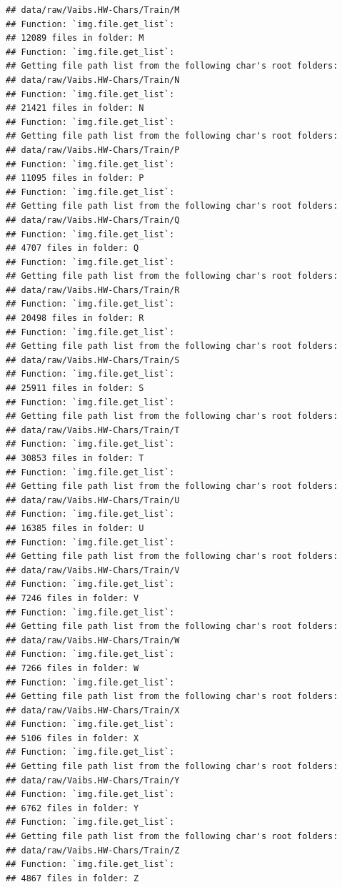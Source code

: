 \documentclass[
]{report}
\begin{document}
\begin{verbatim}
## data/raw/Vaibs.HW-Chars/Train/M
## Function: `img.file.get_list`:
## 12089 files in folder: M
## Function: `img.file.get_list`:
## Getting file path list from the following char's root folders:
## data/raw/Vaibs.HW-Chars/Train/N
## Function: `img.file.get_list`:
## 21421 files in folder: N
## Function: `img.file.get_list`:
## Getting file path list from the following char's root folders:
## data/raw/Vaibs.HW-Chars/Train/P
## Function: `img.file.get_list`:
## 11095 files in folder: P
## Function: `img.file.get_list`:
## Getting file path list from the following char's root folders:
## data/raw/Vaibs.HW-Chars/Train/Q
## Function: `img.file.get_list`:
## 4707 files in folder: Q
## Function: `img.file.get_list`:
## Getting file path list from the following char's root folders:
## data/raw/Vaibs.HW-Chars/Train/R
## Function: `img.file.get_list`:
## 20498 files in folder: R
## Function: `img.file.get_list`:
## Getting file path list from the following char's root folders:
## data/raw/Vaibs.HW-Chars/Train/S
## Function: `img.file.get_list`:
## 25911 files in folder: S
## Function: `img.file.get_list`:
## Getting file path list from the following char's root folders:
## data/raw/Vaibs.HW-Chars/Train/T
## Function: `img.file.get_list`:
## 30853 files in folder: T
## Function: `img.file.get_list`:
## Getting file path list from the following char's root folders:
## data/raw/Vaibs.HW-Chars/Train/U
## Function: `img.file.get_list`:
## 16385 files in folder: U
## Function: `img.file.get_list`:
## Getting file path list from the following char's root folders:
## data/raw/Vaibs.HW-Chars/Train/V
## Function: `img.file.get_list`:
## 7246 files in folder: V
## Function: `img.file.get_list`:
## Getting file path list from the following char's root folders:
## data/raw/Vaibs.HW-Chars/Train/W
## Function: `img.file.get_list`:
## 7266 files in folder: W
## Function: `img.file.get_list`:
## Getting file path list from the following char's root folders:
## data/raw/Vaibs.HW-Chars/Train/X
## Function: `img.file.get_list`:
## 5106 files in folder: X
## Function: `img.file.get_list`:
## Getting file path list from the following char's root folders:
## data/raw/Vaibs.HW-Chars/Train/Y
## Function: `img.file.get_list`:
## 6762 files in folder: Y
## Function: `img.file.get_list`:
## Getting file path list from the following char's root folders:
## data/raw/Vaibs.HW-Chars/Train/Z
## Function: `img.file.get_list`:
## 4867 files in folder: Z
\end{verbatim}

\protect{}\label{func.img.file.get_list.args}
\end{document}
